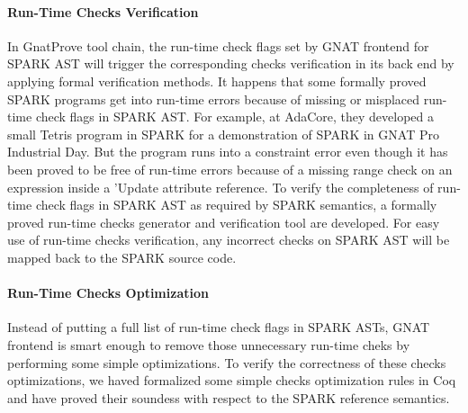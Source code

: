\paragraph{Run-Time Checks Verification}
In GnatProve tool chain, the run-time check flags set by GNAT frontend for SPARK
AST will trigger the corresponding checks verification in its back end by
applying formal verification methods. It happens that some formally proved SPARK
programs get into run-time errors because of missing or misplaced run-time check
flags in SPARK AST. For example, at AdaCore, they developed a small Tetris
program in SPARK for a demonstration of SPARK in GNAT Pro Industrial Day. But
the program runs into a constraint error even though it has been proved to be
free of run-time errors because of a missing range check on an expression
inside a 'Update attribute reference.
To verify the completeness of run-time check flags in SPARK AST as required by
SPARK semantics, a formally proved run-time checks generator and verification
tool are developed. For easy use of run-time checks verification, any incorrect
checks on SPARK AST will be mapped back to the SPARK source code. 

\paragraph{Run-Time Checks Optimization}
Instead of putting a full list of run-time check flags in SPARK ASTs, GNAT
frontend is smart enough to remove those unnecessary run-time cheks by
performing some simple optimizations. To verify the correctness of these checks
optimizations, we haved formalized some simple checks optimization rules in Coq
and have proved their soundess with respect to the SPARK reference semantics.

